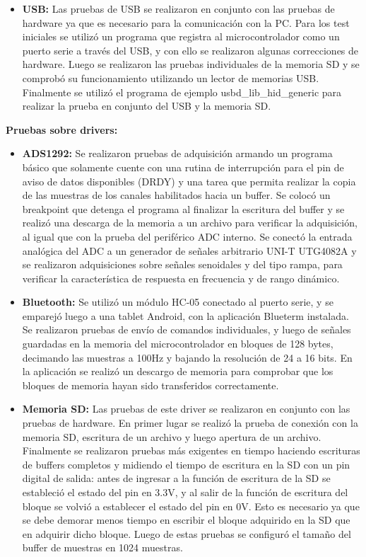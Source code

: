 \begin{itemize}
\item \textbf{USB:} Las pruebas de USB se realizaron en conjunto con las pruebas de hardware ya que es necesario para la comunicación con la PC. Para los test iniciales se utilizó un programa que registra al microcontrolador como un puerto serie a través del USB, y con ello se realizaron algunas correcciones de hardware. Luego se realizaron las pruebas individuales de la memoria SD y se comprobó su funcionamiento utilizando un lector de memorias USB. Finalmente se utilizó el programa de ejemplo usbd\_lib\_hid\_generic para realizar la prueba en conjunto del USB y la memoria SD.

\end{itemize}


\textbf{Pruebas sobre drivers:}


\begin{itemize}

\item \textbf{ADS1292:} Se realizaron pruebas de adquisición armando un programa básico que solamente cuente con una rutina de interrupción para el pin de aviso de datos disponibles (DRDY) y una tarea que permita realizar la copia de las muestras de los canales habilitados hacia un buffer. Se colocó un breakpoint que detenga el programa al finalizar la escritura del buffer y se realizó una descarga de la memoria a un archivo para verificar la adquisición, al igual que con la prueba del periférico ADC interno. Se conectó la entrada analógica del ADC a un generador de señales arbitrario UNI-T UTG4082A y se realizaron adquisiciones sobre señales senoidales y del tipo rampa, para verificar la característica de respuesta en frecuencia y de rango dinámico. 

\item \textbf{Bluetooth:} Se utilizó un módulo HC-05 conectado al puerto serie, y se emparejó luego a una tablet Android, con la aplicación Blueterm\citep{pymasde2013} instalada. Se realizaron pruebas de envío de comandos individuales, y luego de señales guardadas en la memoria del microcontrolador en bloques de 128 bytes, decimando las muestras a 100Hz y bajando la resolución de 24 a 16 bits. En la aplicación se realizó un descargo de memoria para comprobar que los bloques de memoria hayan sido transferidos correctamente.

\item \textbf{Memoria SD:} Las pruebas de este driver se realizaron en conjunto con las pruebas de hardware. En primer lugar se realizó la prueba de conexión con la memoria SD, escritura de un archivo y luego apertura de un archivo. Finalmente se realizaron pruebas más exigentes en tiempo haciendo escrituras de buffers completos y midiendo el tiempo de escritura en la SD con un pin digital de salida: antes de ingresar a la función de escritura de la SD se estableció el estado del pin en 3.3V, y al salir de la función de escritura del bloque se volvió a establecer el estado del pin en 0V. Esto es necesario ya que se debe demorar menos tiempo en escribir el bloque adquirido en la SD que en adquirir dicho bloque. Luego de estas pruebas se configuró el tamaño del buffer de muestras en 1024 muestras.

\end{itemize}

